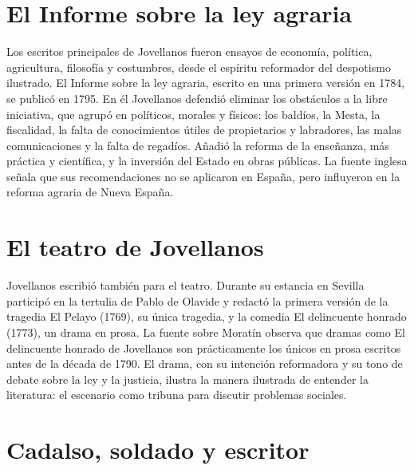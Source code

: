 \documentclass{book}
\begin{document}

\section{El Informe sobre la ley agraria}

Los escritos principales de Jovellanos fueron ensayos de economía, política, agricultura, filosofía y costumbres, desde el espíritu reformador del despotismo ilustrado. El Informe sobre la ley agraria, escrito en una primera versión en 1784, se publicó en 1795. En él Jovellanos defendió eliminar los obstáculos a la libre iniciativa, que agrupó en políticos, morales y físicos: los baldíos, la Mesta, la fiscalidad, la falta de conocimientos útiles de propietarios y labradores, las malas comunicaciones y la falta de regadíos. Añadió la reforma de la enseñanza, más práctica y científica, y la inversión del Estado en obras públicas. La fuente inglesa señala que sus recomendaciones no se aplicaron en España, pero influyeron en la reforma agraria de Nueva España.


\section{El teatro de Jovellanos}

Jovellanos escribió también para el teatro. Durante su estancia en Sevilla participó en la tertulia de Pablo de Olavide y redactó la primera versión de la tragedia El Pelayo (1769), su única tragedia, y la comedia El delincuente honrado (1773), un drama en prosa. La fuente sobre Moratín observa que dramas como El delincuente honrado de Jovellanos son prácticamente los únicos en prosa escritos antes de la década de 1790. El drama, con su intención reformadora y su tono de debate sobre la ley y la justicia, ilustra la manera ilustrada de entender la literatura: el escenario como tribuna para discutir problemas sociales.


\section{Cadalso, soldado y escritor}
\end{document}
